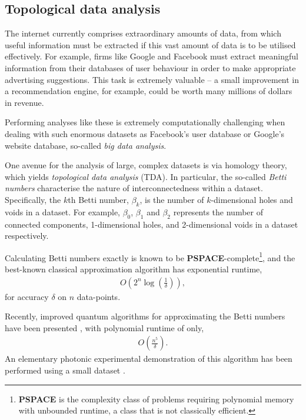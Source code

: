 %
%

\subsection{Topological data analysis} \label{sec:TDA}

The internet currently comprises extraordinary amounts of data, from which useful information must be extracted if this vast amount of data is to be utilised effectively. For example, firms like Google and Facebook must extract meaningful information from their databases of user behaviour in order to make appropriate advertising suggestions. This task is extremely valuable -- a small improvement in a recommendation engine, for example, could be worth many millions of dollars in revenue.

Performing analyses like these is extremely computationally challenging when dealing with such enormous datasets as Facebook's user database or Google's website database, so-called \textit{big data analysis}.

One avenue for the analysis of large, complex datasets is via homology theory, which yields \textit{topological data analysis} (TDA). In particular, the so-called \textit{Betti numbers} characterise the nature of interconnectedness within a dataset. Specifically, the $k$th Betti number, $\beta_k$, is the number of $k$-dimensional holes and voids in a dataset. For example, $\beta_0$, $\beta_1$ and $\beta_2$ represents the number of connected components, 1-dimensional holes, and 2-dimensional voids in a dataset respectively.

Calculating Betti numbers exactly is known to be \textbf{PSPACE}-complete\footnote{\textbf{PSPACE} is the complexity class of problems requiring polynomial memory with unbounded runtime, a class that is not classically efficient.}, and the best-known classical approximation algorithm has exponential runtime,
\begin{align}
O\left(2^n \log \left(\frac{1}{\delta}\right)\right),
\end{align}
for accuracy $\delta$ on $n$ data-points.

Recently, improved quantum algorithms for approximating the Betti numbers have been presented \cite{bib:lloyd2016quantum, bib:PhysRevLett.113.130503, bib:GiovannettiLloyd08}, with polynomial runtime of only,
\begin{align}
O\left(\frac{n^5}{\delta}\right).
\end{align}
An elementary photonic experimental demonstration of this algorithm has been performed using a small dataset \cite{bib:LuRohdeTDAopt}.

